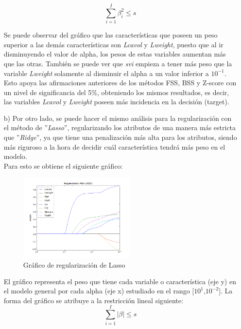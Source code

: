 \documentclass[10pt]{article}
\begin{document}
\begin{itemize}
\begin{equation} \label{ridge}
\sum_{i=1}^I \beta_i^2 \leq s
\end{equation}

Se puede observar del gráfico que las características que poseen un peso superior a las demás características son \textit{Lcavol} y \textit{Lweight}, puesto que al ir disminuyendo el valor de alpha, los pesos de estas variables aumentan más que las otras. También se puede ver que \textit{svi} empieza a tener más peso que la variable \textit{Lweight} solamente al disminuir el alpha a un valor inferior a $10^{-1}$. Esto apoya las afirmaciones anteriores de los métodos FSS, BSS y Z-score con un nivel de significancia del 5\%, obteniendo los mismos resultados, es decir, las variables \textit{Lcavol} y \textit{Lweight} poseen más incidencia en la decisión (target).


\item[b)] Por otro lado, se puede hacer el mismo análisis para la regularización con el método de ''\textit{Lasso}'', regularizando los atributos de una manera más estricta que ''\textit{Ridge}'', ya que tiene una penalización más alta para los atributos, siendo más riguroso a la hora de decidir cuál característica tendrá más peso en el modelo.\\

Para esto se obtiene el siguiente gráfico:
\begin{figure}[!htb]
   \centering
   \includegraphics[width=0.55\textwidth]{images/regularization_lasso}
   \caption{Gráfico de regularización de Lasso}
   \label{lasso}
\end{figure}

El gráfico representa el peso que tiene cada variable o característica (eje y) en el modelo general por cada alpha (eje x) estudiado en el rango [$10^1$,$10^{-2}$]. La forma del gráfico se atribuye a la restricción lineal siguiente: \\

\begin{equation}
\sum_{i=1}^I |\beta| \leq s
\end{equation}


\end{itemize}
\end{document}
